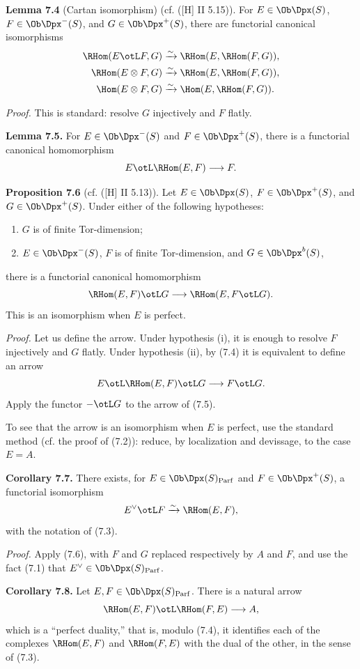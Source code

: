 \documentclass[11pt]{article}
\newcommand{\Parf}{\operatorname{Parf}}
\begin{document}
\textbf{Lemma 7.4} (Cartan isomorphism) (cf. ([H] II 5.15)). For \(E\in\Ob\Dpx(S)\), \(F\in\Ob\Dpx^-(S)\), and \(G\in\Ob\Dpx^+(S)\), there are functorial canonical isomorphisms
\[
\begin{aligned}
\RHom(E\otL F,G)&\xrightarrow{\sim}\RHom(E,\RHom(F,G)),\\
\RHom(E\otimes F,G)&\xrightarrow{\sim}\RHom(E,\RHom(F,G)),\\
\Hom(E\otimes F,G)&\xrightarrow{\sim}\Hom(E,\RHom(F,G)).
\end{aligned}
\]

\emph{Proof.} This is standard: resolve \(G\) injectively and \(F\) flatly.

\textbf{Lemma 7.5.} For \(E\in\Ob\Dpx^-(S)\) and \(F\in\Ob\Dpx^+(S)\), there is a functorial canonical homomorphism
\[
  E\otL \RHom(E,F)\longrightarrow F.
\]

\textbf{Proposition 7.6} (cf. ([H] II 5.13)). Let \(E\in\Ob\Dpx(S)\), \(F\in\Ob\Dpx^+(S)\), and \(G\in\Ob\Dpx^+(S)\). Under either of the following hypotheses:
\begin{enumerate}[label=(\roman*)]
\item \(G\) is of finite Tor-dimension;
\item \(E\in\Ob\Dpx^-(S)\), \(F\) is of finite Tor-dimension, and \(G\in\Ob\Dpx^b(S)\),
\end{enumerate}
there is a functorial canonical homomorphism
\[
  \RHom(E,F)\otL G
  \longrightarrow
  \RHom(E,F\otL G).
\]
This is an isomorphism when \(E\) is perfect.

\emph{Proof.} Let us define the arrow. Under hypothesis (i), it is enough to resolve \(F\) injectively and \(G\) flatly. Under hypothesis (ii), by (7.4) it is equivalent to define an arrow
\[
  E\otL\RHom(E,F)\otL G\longrightarrow F\otL G.
\]
Apply the functor \(-\otL G\) to the arrow of (7.5).

To see that the arrow is an isomorphism when \(E\) is perfect, use the standard method (cf. the proof of (7.2)): reduce, by localization and devissage, to the case \(E=A\).

\textbf{Corollary 7.7.} There exists, for \(E\in\Ob\Dpx(S)_{\Parf}\) and \(F\in\Ob\Dpx^+(S)\), a functorial isomorphism
\[
  E^\vee\otL F\xrightarrow{\sim}\RHom(E,F),
\]
with the notation of (7.3).

\emph{Proof.} Apply (7.6), with \(F\) and \(G\) replaced respectively by \(A\) and \(F\), and use the fact (7.1) that \(E^\vee\in\Ob\Dpx(S)_{\Parf}\).

\textbf{Corollary 7.8.} Let \(E,F\in\Ob\Dpx(S)_{\Parf}\). There is a natural arrow
\[
  \RHom(E,F)\otL \RHom(F,E)\longrightarrow A,
\]
which is a ``perfect duality,'' that is, modulo (7.4), it identifies each of the complexes \(\RHom(E,F)\) and \(\RHom(F,E)\) with the dual of the other, in the sense of (7.3).
\end{document}
